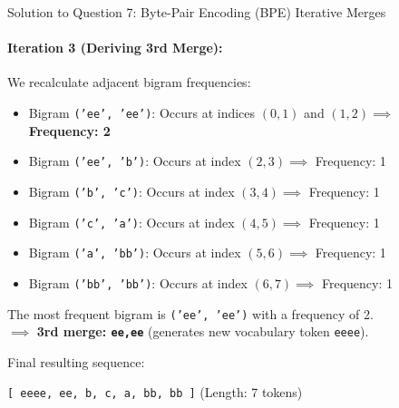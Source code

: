 \documentclass[11pt,a4paper]{article}
\begin{document}
\begin{solutionbox}{Solution to Question 7: Byte-Pair Encoding (BPE) Iterative Merges}
\paragraph{Iteration 3 (Deriving 3rd Merge):}
We recalculate adjacent bigram frequencies:
\begin{itemize}[leftmargin=2em]
    \item Bigram \texttt{('ee', 'ee')}: Occurs at indices $(0,1)$ and $(1,2) \implies$ \textbf{Frequency: 2}
    \item Bigram \texttt{('ee', 'b')}: Occurs at index $(2,3) \implies$ Frequency: 1
    \item Bigram \texttt{('b', 'c')}: Occurs at index $(3,4) \implies$ Frequency: 1
    \item Bigram \texttt{('c', 'a')}: Occurs at index $(4,5) \implies$ Frequency: 1
    \item Bigram \texttt{('a', 'bb')}: Occurs at index $(5,6) \implies$ Frequency: 1
    \item Bigram \texttt{('bb', 'bb')}: Occurs at index $(6,7) \implies$ Frequency: 1
\end{itemize}
The most frequent bigram is \texttt{('ee', 'ee')} with a frequency of 2.\\
$\implies$ \textbf{3rd merge: \texttt{ee,ee}} (generates new vocabulary token \texttt{eeee}).

Final resulting sequence:
\begin{center}
\texttt{[ eeee, ee, b, c, a, bb, bb ]} \quad (Length: 7 tokens)
\end{center}
\end{solutionbox}

\newpage
\end{document}

